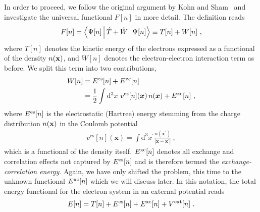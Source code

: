 In order to proceed, we follow the original argument by Kohn and Sham~\cite{Kohn1965} and investigate the universal functional $F[n]$ in more detail. The definition reads
\begin{align}
	F[n] 
		= \Braket{\Psi [n] | \hat T + \hat W | \Psi [n]}
		\equiv T[n] + W[n]~,
	\label{eq:dft.Fn.2}
\end{align}
where $T[n]$ denotes the kinetic energy of the electrons expressed as a functional of the density $n ({\bf x})$, and $W[n]$ denotes the electron-electron interaction term as before. We split this term into two contributions,
\begin{align}
	\begin{split}
	W[n] 
		&= E^{\rm es} [n] + E^{\rm xc} [n] \\
		&= \frac{1}{2} \int \mathrm{d}^{3} x ~ 
			v^{\mathrm{es}}[n](\boldsymbol{x}) \, n(\boldsymbol{x})+E^{\mathrm{xc}}[n]~,
	\end{split}
	\label{eq:dft.KS.W}
\end{align}
where $E^{\rm es} [n]$ is the electrostatic (Hartree) energy stemming from the charge distribution $n ({\bf x})$ in the Coulomb potential
\begin{align}
	v^{\mathrm{es}}[n](\boldsymbol{x})
		= \int \mathrm{d}^{3} x^{\prime} \frac{n\left(\boldsymbol{x}^{\prime}\right)}{\left|\boldsymbol{x}-\boldsymbol{x}^{\prime}\right|}~,
	\label{eq:dft.KS.ves}
\end{align}
which is a functional of the density itself. $E^{\rm xc} [n]$ denotes all exchange and correlation effects not captured by $E^{\rm es} [n]$ and is therefore termed the \emph{exchange-correlation energy}. Again, we have only shifted the problem, this time to the unknown functional $E^{\rm xc} [n]$ which we will discuss later.
In this notation, the total energy functional for the electron system in an external potential reads
\begin{align}
	E[n]
		= T[n] +  E^{\rm es}[n] + E^{\rm xc} [n] + V^{\rm ext}[n]~.
	\label{eq:dft.Ks.En}
\end{align}

